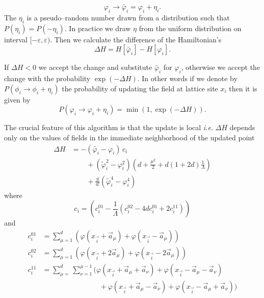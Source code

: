 \documentclass[a4paper]{llncs}
\renewcommand{\a}[1]{\v{a}_{#1}}
\renewcommand{\v}[1]{\vec{#1}}
\newcommand{\vphi}{\varphi}
\newcommand{\vi}{{\vec{i}}}
\begin{document}
\begin{equation}
\vphi_i\longrightarrow\widetilde{\vphi_i}=\vphi_i+\eta_i.
\end{equation}
The $\eta_i$ is a pseudo--random number drawn from a distribution such
that $P(\eta_i) = P(-\eta_i)$. In practice we draw  $\eta$ from the
uniform distribution on interval $[-\varepsilon,\varepsilon)$.  Then we
calculate the difference of the Hamiltonian's
\begin{equation}
\Delta H=H[\widetilde{\vphi_i}]-H[\vphi_i].
\end{equation}

If $\Delta H < 0$ we accept the change and substitute
$\widetilde{\vphi_i}$ for $\vphi_i$, otherwise we accept the change
with the probability $\exp(-\Delta H)$. In other words if we denote by
$P(\phi_i\rightarrow\phi_i+\eta_i)$ the probability of updating the
field at lattice site $x_i$ then it is given by
\begin{equation}
P(\vphi_i\rightarrow\vphi_i+\eta_i)=\min\left(1,\exp(-\Delta H)\right).
\end{equation}

The crucial feature of this algorithm is that the update is local {\em
  i.e.} $\Delta H$ depends only on the values of fields in the
immediate neighborhood of the updated point
\begin{equation}
\begin{split}
\Delta H & = -(\widetilde{\vphi_i}-\vphi_i)\, c_i\\
&\phantom{= -}
+(\widetilde{\vphi}^2_i-\vphi_i^2)\left(d+\frac{\mu^2}{2}+d (1+2d)\frac{1}{\Lambda}\right)\\
&\phantom{= -}+\frac{g}{4!}\left(\widetilde{\vphi}^4_i-\vphi^4_i\right)
\end{split}
\end{equation}
where
\begin{equation}
c_i=\left(c^{01}_i-\frac{1}{\Lambda}(c^{02}_i-4 d c^{01}_i+2 c^{11}_i )\right)
\end{equation}
and
\begin{equation}\label{eq:corona-terms}\begin{split}
c_i^{01}&=\sum_{\mu=1}^d\left(\vphi(x_\vi+\a\mu)+\vphi(x_\vi-\a\mu)\right)\\
c_i^{02}&=\sum_{\mu=1}^d\left(\vphi(x_\vi+2\a\mu)+\vphi(x_\vi-2\a\mu)\right)\\
c_i^{11}&=\sum_{\mu=}^d\sum_{\nu=1}^{\mu-1}
\bigl(\vphi(x_\vi+\a\mu+\a\nu)+\vphi(x_\vi-\a\mu-\a\nu)\\
&\phantom{+=\sum_{\mu=}^d\sum_{\nu=1}^{\mu-1}
}
+ \vphi(x_\vi+\a\mu-\a\nu)+\vphi(x_\vi-\a\mu+\a\nu)
\bigr)
\end{split}
\end{equation}
\end{document}
